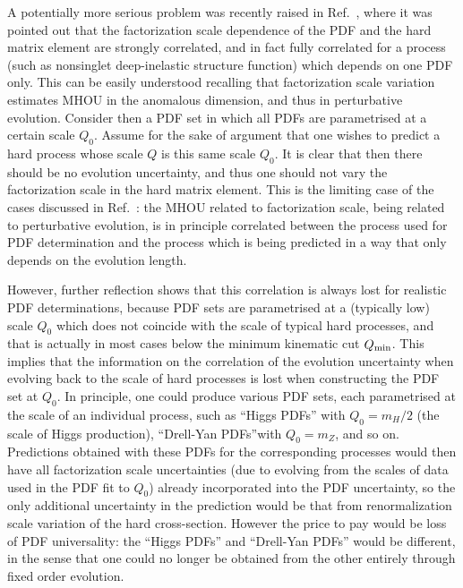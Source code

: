 A potentially more serious problem was recently raised in
Ref.~\cite{Harland-Lang:2018bxd}, where it was pointed out that the
factorization scale dependence of the PDF and the hard matrix element
are strongly correlated, and in fact fully correlated for a process
(such as nonsinglet deep-inelastic structure function) which
depends on one PDF only.
%
This can be easily understood recalling that
factorization scale variation estimates MHOU in the anomalous
dimension, and thus in perturbative evolution.
%
Consider then
a PDF set in which all PDFs are parametrised at a
certain scale $Q_0$.
%
Assume for the sake of argument that one wishes to
predict a hard process whose scale $Q$ is this same scale $Q_0$.
%
It is clear that then there should be no evolution uncertainty, and thus one
should not vary the factorization scale in the hard matrix
element.
%
This is the limiting case of the cases discussed in
Ref.~\cite{Harland-Lang:2018bxd}: the MHOU related to factorization
scale, being related to perturbative evolution, is in principle
correlated between
the process used for PDF determination and the process which is being
predicted in a way that only depends on the evolution length.

However, further reflection shows that this correlation is always
lost for realistic PDF determinations, because PDF sets are
parametrised at a (typically low) scale $Q_0$ which does not coincide
with the scale of typical hard processes, and that is actually in most cases
below the minimum kinematic cut $Q_{\rm min}$.
%
This implies that the information on the
correlation of the evolution uncertainty when evolving back to the scale of 
hard processes is lost when constructing the PDF set at $Q_0$.
%
In principle, one could produce various PDF sets,
each parametrised at the scale of an individual process, such as
``Higgs PDFs'' with $Q_0=m_H/2$ (the scale of Higgs production),
``Drell-Yan PDFs''with $Q_0=m_Z$, and so on.
%
Predictions obtained with these PDFs
for the corresponding processes would then have all factorization scale
uncertainties (due to evolving from the scales of data used in the PDF 
fit to $Q_0$) already incorporated into the PDF uncertainty, so the only 
additional uncertainty in the prediction would be that from renormalization 
scale variation of the hard cross-section. However the price to pay would 
be loss of PDF universality: the ``Higgs PDFs'' and ``Drell-Yan PDFs'' would 
be different, in the sense that one could no longer be obtained from the 
other entirely through fixed order evolution.

